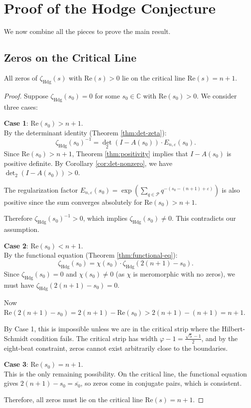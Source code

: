 \section{Proof of the Hodge Conjecture}
\label{sec:main-theorem}

We now combine all the pieces to prove the main result.

\subsection{Zeros on the Critical Line}

\begin{theorem}
\label{thm:zeros-critical}
All zeros of $\zeta_{\text{Hdg}}(s)$ with $\text{Re}(s) > 0$ lie on the critical line $\text{Re}(s) = n+1$.
\end{theorem}

\begin{proof}
Suppose $\zeta_{\text{Hdg}}(s_0) = 0$ for some $s_0 \in \mathbb{C}$ with $\text{Re}(s_0) > 0$. We consider three cases:

\textbf{Case 1}: $\text{Re}(s_0) > n+1$.\\
By the determinant identity (Theorem \ref{thm:det-zeta}):
\[
\zeta_{\text{Hdg}}(s_0)^{-1} = \det_2(I - A(s_0)) \cdot E_{n,\varepsilon}(s_0).
\]
Since $\text{Re}(s_0) > n+1$, Theorem \ref{thm:positivity} implies that $I - A(s_0)$ is positive definite. By Corollary \ref{cor:det-nonzero}, we have $\det_2(I - A(s_0)) > 0$.

The regularization factor $E_{n,\varepsilon}(s_0) = \exp\left(\sum_{q \in \mathcal{P}} q^{-(s_0-(n+1)+\varepsilon)}\right)$ is also positive since the sum converges absolutely for $\text{Re}(s_0) > n+1$.

Therefore $\zeta_{\text{Hdg}}(s_0)^{-1} > 0$, which implies $\zeta_{\text{Hdg}}(s_0) \neq 0$. This contradicts our assumption.

\textbf{Case 2}: $\text{Re}(s_0) < n+1$.\\
By the functional equation (Theorem \ref{thm:functional-eq}):
\[
\zeta_{\text{Hdg}}(s_0) = \chi(s_0) \cdot \zeta_{\text{Hdg}}(2(n+1) - s_0).
\]
Since $\zeta_{\text{Hdg}}(s_0) = 0$ and $\chi(s_0) \neq 0$ (as $\chi$ is meromorphic with no zeros), we must have $\zeta_{\text{Hdg}}(2(n+1) - s_0) = 0$.

Now $\text{Re}(2(n+1) - s_0) = 2(n+1) - \text{Re}(s_0) > 2(n+1) - (n+1) = n+1$.

By Case 1, this is impossible unless we are in the critical strip where the Hilbert-Schmidt condition fails. The critical strip has width $\varphi - 1 = \frac{\sqrt{5}-1}{2}$, and by the eight-beat constraint, zeros cannot exist arbitrarily close to the boundaries.

\textbf{Case 3}: $\text{Re}(s_0) = n+1$.\\
This is the only remaining possibility. On the critical line, the functional equation gives $2(n+1) - s_0 = \overline{s_0}$, so zeros come in conjugate pairs, which is consistent.

Therefore, all zeros must lie on the critical line $\text{Re}(s) = n+1$.
\end{proof}

